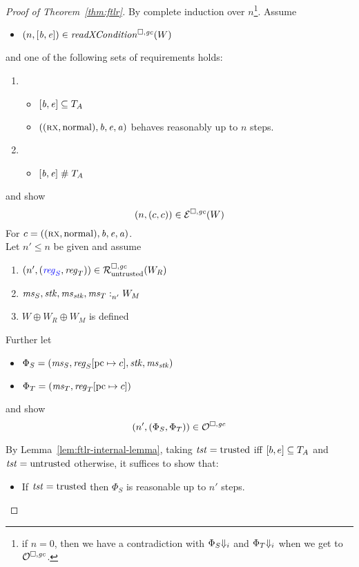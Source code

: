 \begin{proof}[Proof of Theorem~\ref{thm:ftlr}]
  By complete induction over $n$\footnote{if $n=0$, then we have a contradiction with $\Phi_S\term[i]$ and $\Phi_T\term[i]$ when we get to $\lro$.}.
  Assume
  \begin{itemize}
  \item $\npair{[\baddr,\eaddr]} \in \xReadCond{W}$
  \end{itemize}
  and one of the following sets of requirements holds:
  \begin{enumerate}[label={\roman*)}]
  \item \begin{itemize}
    \item $[\baddr,\eaddr] \subseteq \ta$
    \item ${((\rx,\normal),\baddr,\eaddr,\aaddr)}$ behaves reasonably up to $n$ steps.
    \end{itemize}
  \item
    \begin{itemize}
    \item $[\baddr,\eaddr] \mathrel{\#} \ta$
    \end{itemize}
  \end{enumerate}
and show
\[
\npair{(c,c)} \in \lre(W)
\]
For $c=((\rx,\normal),\baddr,\eaddr,\aaddr)$.\\

Let $n' \leq n$ be given and assume
\begin{enumerate}
\item $\npair[n']{\stpair{\reg}{\reg}} \in \lrr(W_R)$ \label{item:reg-ass}
\item $\memSat[n']{\ms_S,\stk,\ms_\stk,\ms_T}{W_M}$\label{item:mem-ass}
\item $W \oplus W_R \oplus W_M$ is defined\label{item:worlds-def}
\end{enumerate}
Further let
\begin{itemize}
\item $\Phi_S = (\ms_S,\reg_S\update{\pcreg}{c},\stk,\ms_\stk)$
\item $\Phi_T = (\ms_T,\reg_T\update{\pcreg}{c})$
\end{itemize}
and show
\[
  \npair[n']{(\Phi_S,\Phi_T)} \in \lro
\]

By Lemma~\ref{lem:ftlr-internal-lemma}, taking $\trust = \trusted$ iff $[b,e] \subseteq \ta$ and $\trust = \untrusted$ otherwise, it suffices to show that:
\begin{itemize}
\item If $\trust =\trusted$ then $ \Phi_S$ is reasonable up to $n'$ steps.


\end{itemize}
\end{proof}
